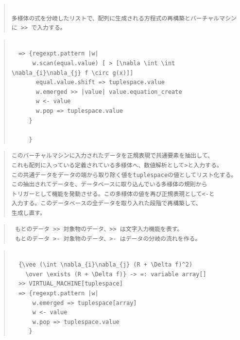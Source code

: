 \documentclass{jsarticle}
\begin{document}
\begin{quote}
\setlength{\baselineskip}{12pt}
\begin{verbatim}

多様体の式を分岐したリストで、配列に生成される方程式の再構築とバーチャルマシン
に >> で入力する。

\end{verbatim}
\end{quote}

\begin{quote}
\setlength{\baselineskip}{12pt}
\begin{verbatim}

  => {regexpt.pattern |w|
      w.scan(equal.value) [ > [\nabla \int \int \nabla_{i}\nabla_{j} f \circ g(x)]]
       equal.value.shift => tuplespace.value
       w.emerged >> |value| value.equation_create 
       w <- value
       w.pop => tuplespace.value
     }

     }
\end{verbatim}
\end{quote}

\begin{quote}
\setlength{\baselineskip}{12pt}
\begin{verbatim}
このバーチャルマシンに入力されたデータを正規表現で共通要素を抽出して、
これも配列に入っている定義されている多様体へ、数値解析として>と入力する。
この共通データをデータの端から取り除く値をtuplespaceの値としてリスト化する。
この抽出されてデータを、データベースに取り込んでいる多様体の規則から
トリガーとして機能を発動させる。この多様体の値を再び正規表現として<-と
入力する。このデータベースの全データを取り入れた段階で再構築して、
生成し直す。

\end{verbatim}
\end{quote}
\begin{quote}
\setlength{\baselineskip}{12pt}
\begin{verbatim}
 もとのデータ >> 対象物のデータ、>> は文字入力機能を表す。
 もとのデータ >- 対象物のデータ、>- はデータの分岐の流れを作る。
\end{verbatim}
\end{quote}



\begin{quote}
\setlength{\baselineskip}{12pt}
\begin{verbatim}

  {\vee (\int \nabla_{i}\nabla_{j} (R + \Delta f)^2) 
    \over \exists (R + \Delta f)} -> =: variable array[]  
  >> VIRTUAL_MACHINE[tuplespace] 
  => {regexpt.pattern |w|
      w.emerged => tuplespace[array]
      w <- value
      w.pop => tuplespace.value
     }
\end{verbatim}
\end{quote}
\end{document}
